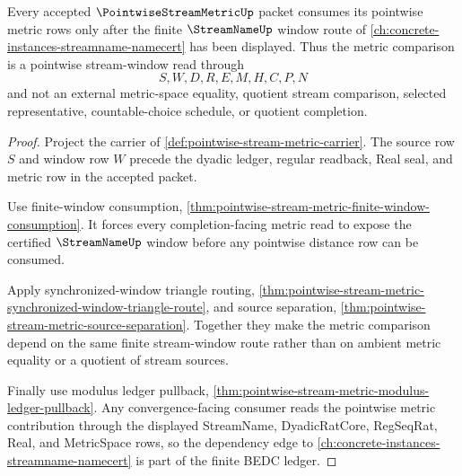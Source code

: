 \begin{theorem}
\label{thm:pointwise-stream-metric-streamname-dependency}
Every accepted $\PointwiseStreamMetricUp$ packet consumes its pointwise metric rows only after the finite $\StreamNameUp$ window route of \autoref{ch:concrete-instances-streamname-namecert} has been displayed. Thus the metric comparison is a pointwise stream-window read through
$$
S,W,D,R,E,M,H,C,P,N
$$
and not an external metric-space equality, quotient stream comparison, selected representative, countable-choice schedule, or quotient completion.
\end{theorem}
\begin{proof}
Project the carrier of \autoref{def:pointwise-stream-metric-carrier}. The source row $S$ and window row $W$ precede the dyadic ledger, regular readback, Real seal, and metric row in the accepted packet.

Use finite-window consumption, \autoref{thm:pointwise-stream-metric-finite-window-consumption}. It forces every completion-facing metric read to expose the certified $\StreamNameUp$ window before any pointwise distance row can be consumed.

Apply synchronized-window triangle routing, \autoref{thm:pointwise-stream-metric-synchronized-window-triangle-route}, and source separation, \autoref{thm:pointwise-stream-metric-source-separation}. Together they make the metric comparison depend on the same finite stream-window route rather than on ambient metric equality or a quotient of stream sources.

Finally use modulus ledger pullback, \autoref{thm:pointwise-stream-metric-modulus-ledger-pullback}. Any convergence-facing consumer reads the pointwise metric contribution through the displayed StreamName, DyadicRatCore, RegSeqRat, Real, and MetricSpace rows, so the dependency edge to \autoref{ch:concrete-instances-streamname-namecert} is part of the finite BEDC ledger.
\end{proof}

